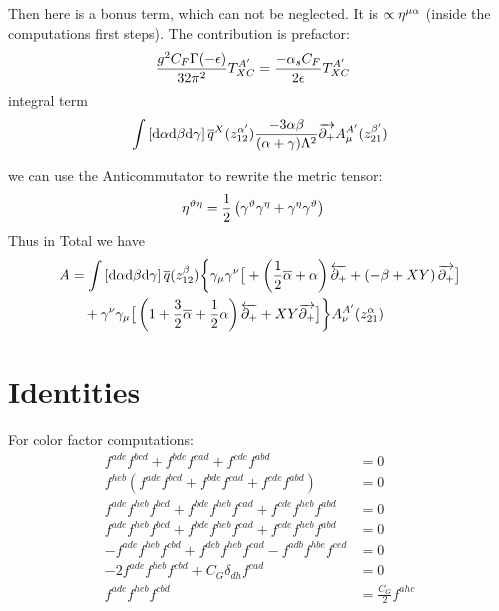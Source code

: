 Then here is a bonus term, which can not be neglected. It is $\propto \eta^{\mu \alpha}$ (inside the computations first steps). The contribution is
prefactor:
\begin{align}
	\frac{g^2C_F\Gamma(-\epsilon)}{32 \pi^2}T^{A'}_{XC} &= 
	\frac{-\alpha_s C_F}{2\epsilon}T^{A'}_{XC}
\end{align}	
integral term
\begin{align}
	\int \left[\text{d} \alpha \text{d} \beta \text{d} \gamma\right] \overline q^X(z_{12}^{\alpha'})\frac{-3\alpha \beta}{(\alpha+\gamma)\Lambda^2}\overrightarrow{\partial_+}  A_\mu^{A'}(z_{21}^{\beta'})
\end{align}

we can use the Anticommutator to rewrite the metric tensor:
\begin{align}
	\eta^{\vartheta\eta} &= \frac{1}{2}\left(\gamma^\vartheta \gamma^\eta + \gamma^\eta \gamma^\vartheta \right)
\end{align}
Thus in Total we have
\begin{align}
	A &=
	\int\left[\text{d} \alpha \text{d} \beta \text{d} \gamma\right] \overline q(z_{12}^\beta)\bigg\{ 
	\gamma_\mu \gamma^\nu \big[
	+\left(\frac{1}{2}\overline{\alpha}+\alpha\right)\overleftarrow{\partial_+}
	+\left(-\beta+XY\right)\overrightarrow{\partial_+}
	\big]
	\\&~~~
	+\gamma^\nu \gamma_\mu \big[
	\left( 1+\frac{3}{2}\overline{\alpha}+\frac{1}{2}\alpha \right)\overleftarrow{\partial_+}
	+XY\overrightarrow{\partial_+}
	\big]
	\bigg\}A_\nu^{A'}(z_{21}^{\alpha})
\end{align}
\section{Identities}
For color factor computations:
\begin{align}
	f^{ade}f^{bcd}+f^{bde}f^{cad}+f^{cde}f^{abd} &= 0
	\\
	f^{heb}(f^{ade}f^{bcd}+f^{bde}f^{cad}+f^{cde}f^{abd}) &= 0
	\\
	f^{ade}f^{heb}f^{bcd}+f^{bde}f^{heb}f^{cad}+f^{cde}f^{heb}f^{abd} &= 0
	\\
	f^{ade}f^{heb}f^{bcd}+f^{bde}f^{heb}f^{cad}+f^{cde}f^{heb}f^{abd} &= 0
	\\
	-f^{ade}f^{heb}f^{cbd}+f^{deb}f^{heb}f^{cad}-f^{adb}f^{hbe}f^{ced} &= 0
	\\
	-2f^{ade}f^{heb}f^{cbd}+C_G\delta_{dh}f^{cad} &= 0
	\\
	f^{ade}f^{heb}f^{cbd} &= \frac{C_G}{2}f^{ahc}
\end{align}

